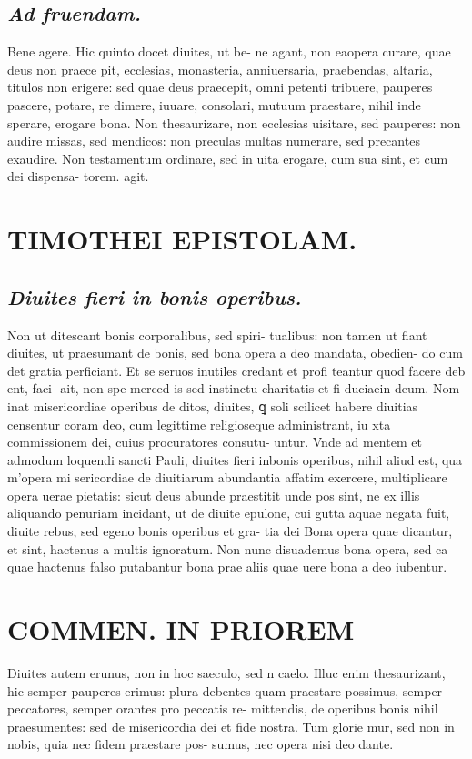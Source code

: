 \documentclass{article}
\begin{document}
\begin{pages}
\subsection*{\textit{Ad fruendam. }}\pstart Bene agere. Hic quinto docet diuites, ut be- ne agant, non eaopera curare, quae deus non praece pit, ecclesias, monasteria, anniuersaria, praebendas, altaria, titulos non erigere: sed quae deus praecepit, omni petenti tribuere, pauperes pascere, potare, re dimere, iuuare, consolari, mutuum praestare, nihil inde sperare, erogare bona. Non thesaurizare, non ecclesias uisitare, sed pauperes: non audire missas, sed mendicos: non preculas multas numerare, sed precantes exaudire. Non testamentum ordinare, sed in uita erogare, cum sua sint, et cum dei dispensa- torem. agit.  \pend
\section*{TIMOTHEI EPISTOLAM. }
\marginpar{[ p.183 ]}
{}
\subsection*{\textit{Diuites fieri in bonis operibus. }}\pstart Non ut ditescant bonis corporalibus, sed spiri- tualibus: non tamen ut fiant diuites, ut praesumant de bonis, sed bona opera a deo mandata, obedien- do cum det gratia perficiant. Et se seruos inutiles credant et profi teantur quod facere deb ent, faci- ait, non spe merced is sed instinctu charitatis et fi duciaein deum. Nom inat misericordiae operibus de ditos, diuites, ꝗ soli scilicet habere diuitias censentur coram deo, cum legittime religioseque administrant, iu xta commissionem dei, cuius procuratores consutu- untur. Vnde ad mentem et admodum loquendi sancti Pauli, diuites fieri inbonis operibus, nihil aliud est, qua m'opera mi sericordiae de diuitiarum abundantia affatim exercere, multiplicare opera uerae pietatis: sicut deus abunde praestitit unde pos sint, ne ex illis aliquando penuriam incidant, ut de diuite epulone, cui gutta aquae negata fuit, diuite rebus, sed egeno bonis operibus et gra- tia dei  \pend\pstart Bona opera quae dicantur, et sint, hactenus a multis ignoratum. Non nunc disuademus bona opera, sed ca quae hactenus falso putabantur bona prae aliis quae uere bona a deo iubentur.  \pend
\section*{COMMEN. IN PRIOREM }
\marginpar{[ p.184 ]}\pstart Diuites autem erunus, non in hoc saeculo, sed n caelo. Illuc enim thesaurizant, hic semper pauperes erimus: plura debentes quam praestare possimus, semper peccatores, semper orantes pro peccatis re- mittendis, de operibus bonis nihil praesumentes: sed de misericordia dei et fide nostra. Tum glorie mur, sed non in nobis, quia nec fidem praestare pos- sumus, nec opera nisi deo dante.  \pend
{}
{}

\end{pages}
\end{document}
